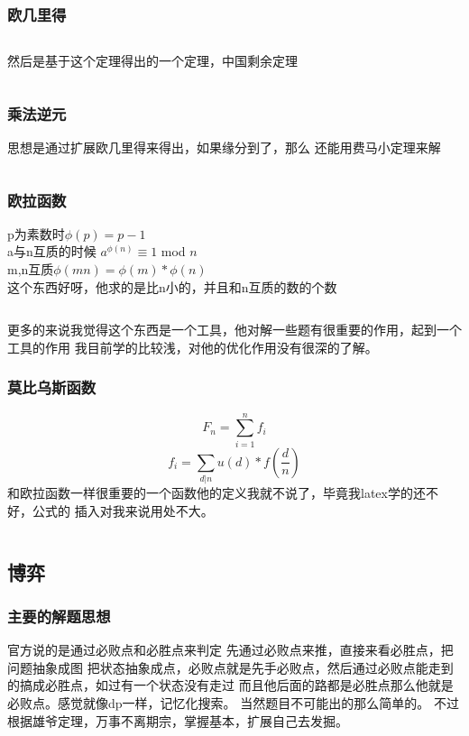 \documentclass[a4paper,11pt]{article}
\begin{document}
\begin{CJK}{UTF8}{gbsn}
\subsubsection{欧几里得}
\inputminted{c++}{../scoure/math/GCD.cpp}
然后是基于这个定理得出的一个定理，中国剩余定理
\inputminted{c++}{../scoure/math/chineseshengyu.cpp}
\subsubsection{乘法逆元}
思想是通过扩展欧几里得来得出，如果缘分到了，那么
还能用费马小定理来解
\inputminted{c++}{../scoure/math/niyuan.cpp}
\subsubsection{欧拉函数}
p为素数时$\phi(p) = p-1 $\\
a与n互质的时候 $a^{\phi(n)}\equiv 1$ mod $ n$\\
m,n互质$\phi(mn) = \phi(m) * \phi(n)$\\

这个东西好呀，他求的是比n小的，并且和n互质的数的个数
\inputminted{c++}{../scoure/math/oula.cpp}
更多的来说我觉得这个东西是一个工具，他对解一些题有很重要的作用，起到一个工具的作用
我目前学的比较浅，对他的优化作用没有很深的了解。
\subsubsection{莫比乌斯函数}
$$ F_n = \sum_{i=1}^n f_i $$
$$ f_i = \sum_{d|n} u(d)*f(\frac{d}{n}) $$
和欧拉函数一样很重要的一个函数他的定义我就不说了，毕竟我latex学的还不好，公式的
插入对我来说用处不大。
\inputminted{c++}{../scoure/math/mobius.cpp}
\newpage
\subsection{博弈}
\subsubsection{主要的解题思想}
官方说的是通过必败点和必胜点来判定
先通过必败点来推，直接来看必胜点，把问题抽象成图 把状态抽象成点，必败点就是先手必败点，然后通过必败点能走到的搞成必胜点，如过有一个状态没有走过 而且他后面的路都是必胜点那么他就是必败点。感觉就像dp一样，记忆化搜索。
当然题目不可能出的那么简单的。
不过根据雄爷定理，万事不离期宗，掌握基本，扩展自己去发掘。

\end{CJK}
\end{document}
